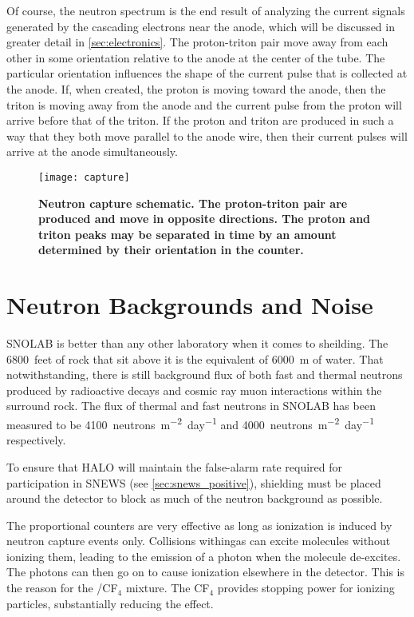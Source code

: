 	Of course, the neutron spectrum is the end result of analyzing the current signals generated by the cascading electrons near the anode, which will be discussed in greater detail in \SEC \ref{sec:electronics}. The proton-triton pair move away from each other in some orientation relative to the anode at the center of the tube. The particular orientation influences the shape of the current pulse that is collected at the anode. If, when created, the proton is moving toward the anode, then the triton is moving away from the anode and the current pulse from the proton will arrive before that of the triton. If the proton and triton are produced in such a way that they both move parallel to the anode wire, then their current pulses will arrive at the anode simultaneously. 

	\begin{figure}[H]
		\centering
		\texttt{[image: capture]}
		\caption[\he Neutron Capture Schematic]{\bf \he Neutron capture schematic\rm \cite{Search2011}. The proton-triton pair are produced and move in opposite directions. The proton and triton peaks may be separated in time by an amount determined by their orientation in the counter.}
		\label{fig:capture}
	\end{figure}

	\section{Neutron Backgrounds and Noise}
	SNOLAB is better than any other laboratory when it comes to sheilding. The \SI[mode=text]{6800}{feet} of rock that sit above it is the equivalent of \SI{6000}{\meter} of water. That notwithstanding, there is still background flux of both fast and thermal neutrons produced by radioactive decays and cosmic ray muon interactions within the surround rock. The flux of thermal and fast neutrons in SNOLAB has been measured to be \SI[mode=text]{4100}{neutrons.m^{-2}.day^{-1}} and \SI[mode=text]{4000}{neutrons.m^{-2}.day^{-1}} respectively\cite{handbook}. 

	To ensure that HALO will maintain the false-alarm rate required for participation in SNEWS (see \SEC \ref{sec:snews_positive}), shielding must be placed around the detector to block as much of the neutron background as possible. 

 
	The proportional counters are very effective as long as ionization is induced by neutron capture events only. Collisions within\he gas can excite molecules without ionizing them, leading to the emission of a photon when the molecule de-excites. The photons can then go on to cause ionization elsewhere in the detector. This is the reason for the \he/CF$_4$ mixture. The CF$_4$ provides stopping power for ionizing particles, substantially reducing the effect.

